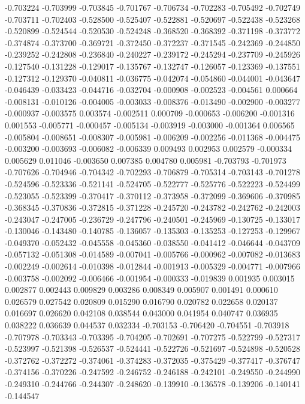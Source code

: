-0.703224
-0.703999
-0.703845
-0.701767
-0.706734
-0.702283
-0.705492
-0.702749
-0.703711
-0.702403
-0.528500
-0.525407
-0.522881
-0.520697
-0.522438
-0.523268
-0.520899
-0.524544
-0.520530
-0.524248
-0.368520
-0.368392
-0.371198
-0.373772
-0.374874
-0.373700
-0.369721
-0.372450
-0.372237
-0.371545
-0.242369
-0.244850
-0.239252
-0.242808
-0.236840
-0.240227
-0.239172
-0.245294
-0.237709
-0.245926
-0.127540
-0.131228
-0.129017
-0.135767
-0.132747
-0.126057
-0.123369
-0.137551
-0.127312
-0.129370
-0.040811
-0.036775
-0.042074
-0.054860
-0.044001
-0.043647
-0.046439
-0.033423
-0.044716
-0.032704
-0.000908
-0.002523
-0.004561
0.000664
-0.008131
-0.010126
-0.004005
-0.003033
-0.008376
-0.013490
-0.002900
-0.003277
-0.000937
-0.003575
0.003574
-0.002511
0.000709
-0.000653
-0.006200
-0.001316
0.001553
-0.005771
-0.000457
-0.005134
-0.003919
-0.003000
-0.001364
0.006565
-0.005804
-0.008651
-0.008307
-0.005981
-0.006209
-0.002256
-0.011368
-0.004475
-0.003200
-0.003693
-0.006082
-0.006339
0.009493
0.002953
0.002579
-0.000334
0.005629
0.011046
-0.003650
0.007385
0.004780
0.005981
-0.703793
-0.701973
-0.707626
-0.704946
-0.704342
-0.702293
-0.706879
-0.705314
-0.703143
-0.701278
-0.524596
-0.523336
-0.521141
-0.524705
-0.522777
-0.525776
-0.522223
-0.524499
-0.523055
-0.523399
-0.370417
-0.370112
-0.373958
-0.372099
-0.369606
-0.370985
-0.368345
-0.370836
-0.372815
-0.371228
-0.245720
-0.243782
-0.242762
-0.242003
-0.243047
-0.247005
-0.236729
-0.247796
-0.240501
-0.245969
-0.130725
-0.133017
-0.130046
-0.143480
-0.140785
-0.136057
-0.135303
-0.135253
-0.127253
-0.129967
-0.049370
-0.052432
-0.045558
-0.045360
-0.038550
-0.041412
-0.046644
-0.043709
-0.057132
-0.051308
-0.014589
-0.007041
-0.005766
-0.000962
-0.007082
-0.013683
-0.002249
-0.002614
-0.010398
-0.012844
-0.001913
-0.005329
-0.004771
-0.007966
-0.003758
-0.002092
-0.006466
-0.001954
-0.000333
-0.019839
0.001935
0.003015
0.002877
0.002443
0.009829
0.003286
0.008349
0.005907
0.001491
0.000610
0.026579
0.027542
0.020809
0.015290
0.016790
0.020782
0.022658
0.020137
0.016697
0.026620
0.042108
0.038544
0.043000
0.041954
0.040747
0.036935
0.038222
0.036639
0.044537
0.032334
-0.703153
-0.706420
-0.704551
-0.703918
-0.707978
-0.703343
-0.703395
-0.704205
-0.702691
-0.707275
-0.522799
-0.527317
-0.523997
-0.521398
-0.526537
-0.524441
-0.522726
-0.521697
-0.524898
-0.520528
-0.372762
-0.372272
-0.374061
-0.374283
-0.372035
-0.375429
-0.377417
-0.376747
-0.374156
-0.370226
-0.247592
-0.246752
-0.246188
-0.242101
-0.249550
-0.244990
-0.249310
-0.244766
-0.244307
-0.248620
-0.139910
-0.136578
-0.139206
-0.140141
-0.144547
